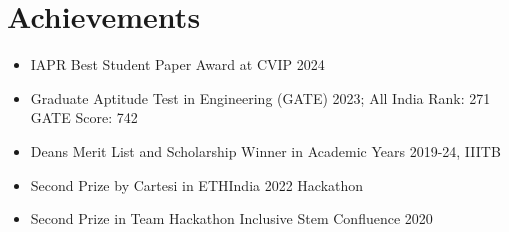 \documentclass[letterpaper,11pt]{article}
\newcommand{\resumeItem}[1]{
  \item\small{
    {#1 \vspace{-2pt}}
  }
}
\newcommand{\resumeItemListStart}{\begin{itemize}}
\newcommand{\resumeItemListEnd}{\end{itemize}\vspace{-5pt}}
\begin{document}
\section{Achievements}
\resumeItemListStart
    \resumeItem{IAPR Best Student Paper Award at CVIP 2024 \href{https://cvip2024.iiitdm.ac.in/awards}{\raisebox{-0.2\height}\faExternalLink}}
    \vspace{-5pt}
    \resumeItem{Graduate Aptitude Test in Engineering (GATE) 2023; All India Rank: 271 GATE Score: 742 \href{https://drive.google.com/file/d/1tzVz76P2CQ7abaAhdvjZjokLpewjO8Wu/view?usp=sharing}{\raisebox{-0.2\height}\faExternalLink}}
    \vspace{-5pt}
    \resumeItem{Deans Merit List and Scholarship Winner in Academic Years 2019-24, IIITB}
    \vspace{-5pt}
    \resumeItem{Second Prize by Cartesi in ETHIndia 2022 Hackathon}
    \vspace{-5pt}
    \resumeItem{Second Prize in Team Hackathon Inclusive Stem Confluence 2020}
\resumeItemListEnd
 \vspace{-12pt}
\end{document}
